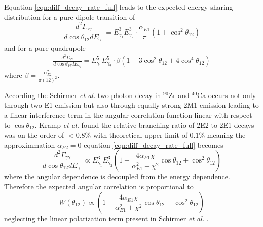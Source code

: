 \documentclass[cnatzke_thesis_proposal.tex]{subfiles}
\begin{document}
Equation \ref{eqn:diff_decay_rate_full} leads to the expected energy sharing distribution for a pure dipole transition of 
\begin{equation}
    \frac{d^2\Gamma_{\gamma\gamma}}{d \cos\theta_{12} dE_{\gamma_1}} =  E_{\gamma_1}^3 E_{\gamma_2}^3 \cdot \frac{\alpha_{E1}}{\pi} \left( 1 + \cos^2\theta_{12} \right)
\end{equation}
and for a pure quadrupole
\begin{align}
    \frac{d^2\Gamma_{\gamma\gamma}}{d \cos\theta_{12} dE_{\gamma_1}} = E_{\gamma_1}^5 E_{\gamma_2}^5 \cdot \beta \left( 1 - 3 \cos^2\theta_{12} + 4 \cos^4 \theta_{12} \right) 
\end{align}
where $\beta = \frac{\alpha_{E2}^2}{\pi (12)^2}$.

According the Schirmer \textit{et al.} two-photon decay in $^{90}$Zr and $^{40}$Ca occurs not only through two E1 emission but also through equally strong 2M1 emission leading to a linear interference term in the angular correlation function linear with respect to $\cos\theta_{12}$. 
Kramp \textit{et al.} found the relative branching ratio of 2E2 to 2E1 decays was on the order of $<0.8\%$ with theoretical upper limit of $0.1\%$ meaning the approximmation $\alpha_{E2} = 0$ equation \ref{eqn:diff_decay_rate_full} becomes 
\begin{equation}
    \frac{d^2\Gamma_{\gamma\gamma}}{d \cos\theta_{12} dE_{\gamma_1}} \propto E_{\gamma_1}^3 E_{\gamma_2}^3 \left( 1 + \frac{4 \alpha_{E1} \chi}{\alpha_{E1}^2 + \chi^2} \cos\theta_{12} +  \cos^2\theta_{12} \right)
\end{equation}
where the angular dependence is decoupled from the energy dependence. Therefore the expected angular correlation is proportional to
\begin{equation} \label{eqn:angular-distribution}
   W(\theta_{12}) \propto \left( 1 + \frac{4 \alpha_{E1} \chi}{\alpha_{E1}^2 + \chi^2} \cos\theta_{12} +  \cos^2\theta_{12} \right)
\end{equation}
neglecting the linear polarization term present in Schirmer \textit{et al.} \cite{schirmer_double_1984}.

\end{document}
